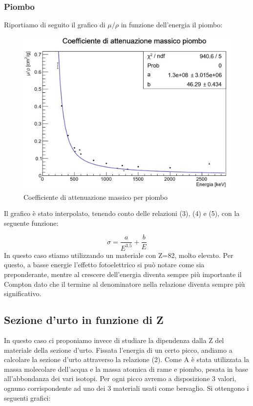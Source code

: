 \documentclass[a4paper,10pt]{article}
\begin{document}
\subsubsection{Piombo}
Riportiamo di seguito il grafico di $\mu/\rho$ in funzione dell'energia il piombo:

\begin{figure}[H]
    \centering
    \includegraphics[scale=0.6]{grafici/massicopiombo}
    \caption{Coefficiente di attenuazione massico per piombo}
\end{figure}

\noindent Il grafico \`e stato interpolato, tenendo conto delle relazioni (3), (4) e (5), con la seguente funzione:

\begin{equation}
	\sigma = \frac{a}{E^{3.5}} + \frac{b}{E}
\end{equation}
In questo caso stiamo utilizzando un materiale con Z=82, molto elevato. Per questo, a basse energie l'effetto fotoelettrico si pu\`o notare come sia preponderante, mentre al crescere dell'energia diventa sempre pi\`u importante il Compton dato che il termine al denominatore nella relazione diventa sempre pi\`u significativo.

\subsection{Sezione d'urto in funzione di Z}
In questo caso ci proponiamo invece di studiare la dipendenza dalla Z del materiale della sezione d'urto. Fissata l'energia di un certo picco, andiamo a calcolare la sezione d'urto attraverso la relazione (2). Come A \`e stata utilizzata la massa molecolare dell'acqua e la massa atomica di rame e piombo, pesata in base all'abbondanza dei vari isotopi. Per ogni picco avremo a disposizione 3 valori, ognuno corrispondente ad uno dei 3 materiali usati come bersaglio. Si ottengono i seguenti grafici:
\end{document}

